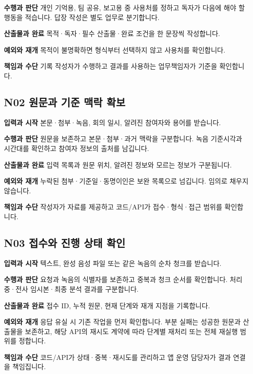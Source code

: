 \documentclass[a4paper,10pt]{article}
\begin{document}
\noindent\textbf{수행과 판단} 개인 기억용, 팀 공유, 보고용 중 사용처를 정하고 독자가 다음에 해야 할 행동을 적습니다. 답장 작성은 별도 업무로 분기합니다.


\noindent\textbf{산출물과 완료} 목적·독자·필수 산출물·완료 조건을 한 문장씩 작성합니다.


\noindent\textbf{예외와 재개} 목적이 불명확하면 형식부터 선택하지 않고 사용처를 확인합니다.


\noindent\textbf{책임과 수단} 기록 작성자가 수행하고 결과를 사용하는 업무책임자가 기준을 확인합니다.


\endgroup
\begingroup\setlength{\parskip}{3pt}
\subsection*{N02 원문과 기준 맥락 확보}
\noindent\textbf{입력과 시작} 본문·첨부·녹음, 회의 일시, 알려진 참여자와 용어를 받습니다.


\noindent\textbf{수행과 판단} 원문을 보존하고 본문·첨부·과거 맥락을 구분합니다. 녹음 기준시각과 시간대를 확인하고 참여자 정보의 출처를 남깁니다.


\noindent\textbf{산출물과 완료} 입력 목록과 원문 위치, 알려진 정보와 모르는 정보가 구분됩니다.


\noindent\textbf{예외와 재개} 누락된 첨부·기준일·동명이인은 보완 목록으로 넘깁니다. 임의로 채우지 않습니다.


\noindent\textbf{책임과 수단} 작성자가 자료를 제공하고 코드/API가 접수·형식·접근 범위를 확인합니다.


\endgroup
\begingroup\setlength{\parskip}{3pt}
\subsection*{N03 접수와 진행 상태 확인}
\noindent\textbf{입력과 시작} 텍스트, 완성 음성 파일 또는 같은 녹음의 순차 청크를 받습니다.


\noindent\textbf{수행과 판단} 요청과 녹음의 식별자를 보존하고 중복과 청크 순서를 확인합니다. 처리 중·전사 임시본·최종 분석 결과를 구분합니다.


\noindent\textbf{산출물과 완료} 접수 ID, 누적 원문, 현재 단계와 재개 지점을 기록합니다.


\noindent\textbf{예외와 재개} 응답 유실 시 기존 작업을 먼저 확인합니다. 부분 실패는 성공한 원문과 산출물을 보존하고, 해당 API의 재시도 계약에 따라 단계별 재처리 또는 전체 재실행 범위를 정합니다.


\noindent\textbf{책임과 수단} 코드/API가 상태·중복·재시도를 관리하고 앱 운영 담당자가 결과 연결을 책임집니다.
\end{document}
